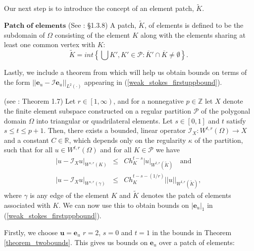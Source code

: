 \documentclass{article}
\begin{document}
Our next step is to introduce the concept of an element patch, $\widetilde{K}$.
\begin{definition}{$\textbf{Patch of elements}$} (See \cite{ainsworth2011posteriori}: \S 1.3.8)
	A patch, $\widetilde{K}$, of elements is defined to be the subdomain of $\Omega$ consisting of the element $K$ along with the elements sharing at least one common vertex with $K$:
	\begin{equation}
	\widetilde{K}=int\left\{\bigcup K', K' \in \mathcal{P}: \overline{K}'\cap\overline{K}\neq \emptyset \right\}.\nonumber
	\end{equation}
\end{definition}
Lastly, we include a theorem from \cite{ainsworth2011posteriori} which will help us obtain bounds on terms of the form $\left|\left|\textbf{e}_u-\mathcal{I}\textbf{e}_u\right|\right|_{L^2\left(\cdot\right)}$ appearing in (\ref{weak_stokes_firstuppbound}).
\begin{theorem}{(see \cite{ainsworth2011posteriori}: Theorem 1.7)}\label{theorem_twobounds}
	Let $r\in\left[1,\infty\right)$, and for a nonnegative $p\in\mathbb{Z}$ let $X$ denote the finite element subspace constructed on a regular partition $\mathcal{P}$ of the polygonal domain $\Omega$ into triangular or quadrilateral elements.  Let $s\in \left[0,1\right]$ and $t$ satisfy $s\leq t\leq p+1$. Then, there exists a bounded, linear operator $\mathcal{I}_X\colon W^{t,r}\left(\Omega\right)\rightarrow X$ and a constant $C\in \mathbb{R}$, which depends only on the regularity $\kappa$ of the partition, such that for all $u\in W^{t,r}\left(\Omega\right)$ and for all $K\in \mathcal{P}$ we have
	\begin{eqnarray}
	\left|u-\mathcal{I}_Xu\right|_{W^{s,r}\left(K\right)} &\leq & Ch_K^{t-s}\left|u\right|_{W^{t,r}\left(\widetilde{K}\right)}\quad\text{and}\nonumber\\
	\left|u-\mathcal{I}_Xu\right|_{W^{s,r}\left(\gamma\right)} &\leq &Ch_K^{t-s-\left(1/r\right)}\left|\left|u\right|\right|_{W^{t,r}\left(\widetilde{K}\right)},\nonumber
	\end{eqnarray}
	where $\gamma$ is any edge of the element $K$ and $\widetilde{K}$ denotes the patch of elements associated with $K$.  We can now use this to obtain bounds on $\left|\textbf{e}_u\right|_1$ in (\ref{weak_stokes_firstuppbound}).
\end{theorem}
Firstly, we choose  $\textbf{u}=\textbf{e}_u$ $r=2$, $s=0$ and $t=1$ in the bounds in Theorem \ref{theorem_twobounds}.  This gives us bounds on $\textbf{e}_u$ over a patch of elements:
\end{document}
